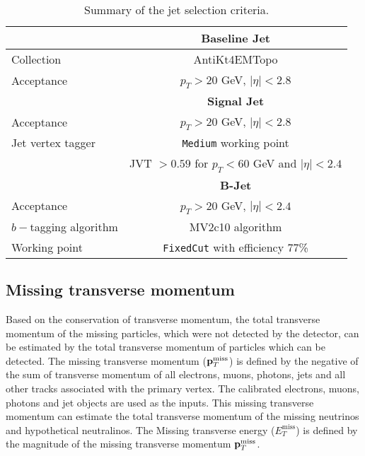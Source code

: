 \begin{table}[htbp]
\begin{center}
\begin{tabular}{|l|c|}
\hline
\hline
& \textbf{Baseline Jet} \\
\hline
\hline
Collection     & AntiKt4EMTopo \\
\hline
Acceptance     & $p_T > 20$ GeV, $|\eta| < 2.8$ \\
\hline
\hline
& \textbf{Signal Jet} \\
\hline
\hline
Acceptance     & $p_T > 20$ GeV, $|\eta | < 2.8$ \\
\hline
Jet vertex tagger  &  \texttt{Medium} working point\\
&  JVT $> 0.59$ for $p_T < 60$ GeV and $|\eta| < 2.4$\\
\hline
\hline
& \textbf{B-Jet} \\
\hline
\hline
Acceptance     & $p_T > 20$ GeV, $|\eta| < 2.4$ \\
\hline
$b-$tagging algorithm &  MV2c10 algorithm \\
Working point & \texttt{FixedCut} with efficiency 77\% \\
\hline
\end{tabular}
\end{center}
\caption{Summary of the jet selection criteria.}
\label{tab:jetsdef}
\end{table}

\subsection{Missing transverse momentum}
Based on the conservation of transverse momentum, the total transverse momentum of the missing particles,  which were not detected by the detector, can be estimated by the total transverse momentum of particles which can be detected.
The missing transverse momentum (${\bf p}_T^{\text{miss}}$) is defined by the negative of the sum of transverse momentum of all electrons, muons, photons, jets and all other tracks associated with the primary vertex.
The calibrated electrons, muons, photons and jet objects are used as the inputs.
This missing transverse momentum can estimate the total transverse momentum of the missing neutrinos and hypothetical neutralinos.
The Missing transverse energy ($E_{T}^{\text{miss}}$) is defined by the magnitude of the missing transverse momentum ${\bf p}_T^{\text{miss}}$.

